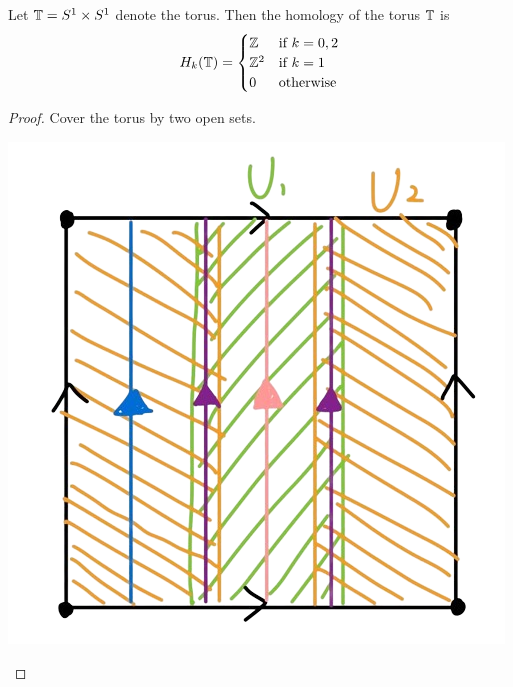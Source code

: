 \documentclass[a4paper]{article}
\begin{document}
\begin{thm}{}{} Let $\mathbb{T}=S^1\times S^1$ denote the torus. Then the homology of the torus $\mathbb{T}$ is $$H_k(\mathbb{T})=\begin{cases}
\mathbb{Z} & \text{if } k=0,2\\
\mathbb{Z}^2 & \text{if } k=1\\
0 & \text{otherwise}
\end{cases}$$ \tcbline
\begin{proof}
Cover the torus by two open sets. 

\begin{center}
\includegraphics[scale = 0.3]{Image 1}
\end{center}


\end{proof}
\end{thm}
\end{document}
